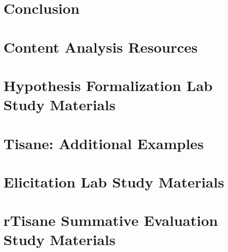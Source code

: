 \documentclass[11pt]{book}
\begin{document}
\chapter{Conclusion}
\label{chapter:conclusion}


\clearpage
{}
\singlespacing



\newpage
\newcommand{\beginsupplement}{%
    \setcounter{chapter}{0}
    \renewcommand{\thechapter}{\Alph{chapter}}%
 }

\appendix
\beginsupplement
\chapter{Content Analysis Resources}
\label{chapter:appHypoForm}


\chapter{Hypothesis Formalization Lab Study Materials}
\label{chapter:appHypoFormLabStudy}


\chapter{Tisane: Additional Examples}
\label{chapter:appTisane}


\chapter{Elicitation Lab Study Materials}
\label{chapter:appTisaneRedesign}


\chapter{rTisane Summative Evaluation Study Materials}
\label{chapter:apprTisane} %

\end{document}
